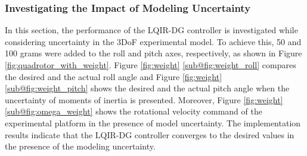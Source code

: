 \documentclass[3p,times]{elsarticle}
\begin{document}
\subsubsection{Investigating the Impact of Modeling Uncertainty}\label{sec:model-uncertainty}
\noindent In this section, the performance of the LQIR-DG controller is investigated while considering uncertainty in the 3DoF experimental model. 
To achieve this, 50 and 100 grams were added to the roll and pitch axes, respectively, as shown in Figure \ref{fig:quadrotor_with_weight}.
Figure \ref{fig:weight} \ref{sub@fig:weight_roll} compares the desired and the actual roll angle and Figure \ref{fig:weight} \ref{sub@fig:weight_pitch} shows the desired and the actual pitch angle when the uncertainty of moments of inertia is presented.
Moreover, Figure \ref{fig:weight} \ref{sub@fig:omega_weight} shows the rotational velocity command of the experimental platform in the presence of model uncertainty.
The implementation results indicate that the LQIR-DG controller converges to the desired values in the presence of the modeling uncertainty.
\end{document}
